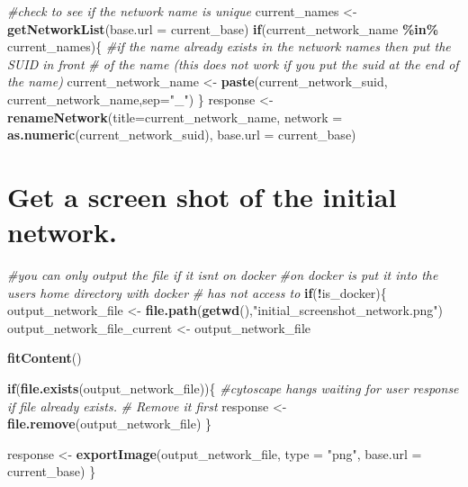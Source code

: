 \documentclass[
]{book}
\newenvironment{Shaded}{\begin{snugshade}}{\end{snugshade}}
\newcommand{\AttributeTok}[1]{\textcolor[rgb]{0.13,0.29,0.53}{#1}}
\newcommand{\CommentTok}[1]{\textcolor[rgb]{0.56,0.35,0.01}{\textit{#1}}}
\newcommand{\ControlFlowTok}[1]{\textcolor[rgb]{0.13,0.29,0.53}{\textbf{#1}}}
\newcommand{\FunctionTok}[1]{\textcolor[rgb]{0.13,0.29,0.53}{\textbf{#1}}}
\newcommand{\NormalTok}[1]{#1}
\newcommand{\OtherTok}[1]{\textcolor[rgb]{0.56,0.35,0.01}{#1}}
\newcommand{\SpecialCharTok}[1]{\textcolor[rgb]{0.81,0.36,0.00}{\textbf{#1}}}
\newcommand{\StringTok}[1]{\textcolor[rgb]{0.31,0.60,0.02}{#1}}
\begin{document}
\begin{Shaded}
\begin{Highlighting}[]
\CommentTok{\#check to see if the network name is unique}
\NormalTok{current\_names }\OtherTok{\textless{}{-}} \FunctionTok{getNetworkList}\NormalTok{(}\AttributeTok{base.url =}\NormalTok{ current\_base)}
\ControlFlowTok{if}\NormalTok{(current\_network\_name }\SpecialCharTok{\%in\%}\NormalTok{ current\_names)\{}
  \CommentTok{\#if the name already exists in the network names then put the SUID in front}
  \CommentTok{\# of the name (this does not work if you put the suid at the end of the name)}
\NormalTok{  current\_network\_name }\OtherTok{\textless{}{-}} \FunctionTok{paste}\NormalTok{(current\_network\_suid,}
\NormalTok{                                current\_network\_name,}\AttributeTok{sep=}\StringTok{"\_"}\NormalTok{)}
\NormalTok{\}}
\NormalTok{response }\OtherTok{\textless{}{-}} \FunctionTok{renameNetwork}\NormalTok{(}\AttributeTok{title=}\NormalTok{current\_network\_name, }
                       \AttributeTok{network =} \FunctionTok{as.numeric}\NormalTok{(current\_network\_suid),}
                       \AttributeTok{base.url =}\NormalTok{ current\_base)}
\end{Highlighting}
\end{Shaded}

\hypertarget{get-a-screen-shot-of-the-initial-network.-1}{%
\section{Get a screen shot of the initial network.}\label{get-a-screen-shot-of-the-initial-network.-1}}

\begin{Shaded}
\begin{Highlighting}[]
\CommentTok{\#you can only output the file if it isn\textquotesingle{}t on docker}
\CommentTok{\#on docker is put it into the user\textquotesingle{}s home directory with docker }
\CommentTok{\# has not access to}
\ControlFlowTok{if}\NormalTok{(}\SpecialCharTok{!}\NormalTok{is\_docker)\{}
\NormalTok{  output\_network\_file }\OtherTok{\textless{}{-}} \FunctionTok{file.path}\NormalTok{(}\FunctionTok{getwd}\NormalTok{(),}\StringTok{"initial\_screenshot\_network.png"}\NormalTok{)}
\NormalTok{  output\_network\_file\_current }\OtherTok{\textless{}{-}}\NormalTok{ output\_network\_file}

  \FunctionTok{fitContent}\NormalTok{()}

  \ControlFlowTok{if}\NormalTok{(}\FunctionTok{file.exists}\NormalTok{(output\_network\_file))\{}
    \CommentTok{\#cytoscape hangs waiting for user response if file already exists.}
    \CommentTok{\# Remove it first}
\NormalTok{    response }\OtherTok{\textless{}{-}} \FunctionTok{file.remove}\NormalTok{(output\_network\_file)}
\NormalTok{  \} }

\NormalTok{  response }\OtherTok{\textless{}{-}} \FunctionTok{exportImage}\NormalTok{(output\_network\_file, }\AttributeTok{type =} \StringTok{"png"}\NormalTok{,}
                          \AttributeTok{base.url =}\NormalTok{ current\_base)}
\NormalTok{\}}
\end{Highlighting}
\end{Shaded}
\end{document}
